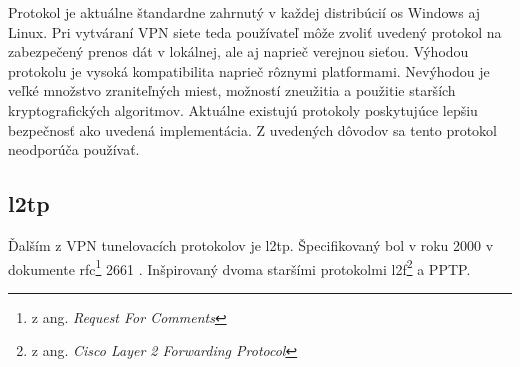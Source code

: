 Protokol je aktuálne štandardne zahrnutý v každej distribúcií \acrshort{os} Windows aj Linux. Pri vytváraní VPN siete teda používateľ môže zvoliť uvedený protokol na zabezpečený prenos dát v lokálnej, ale aj naprieč verejnou sieťou. Výhodou protokolu je vysoká kompatibilita naprieč rôznymi platformami. Nevýhodou je veľké množstvo zraniteľných miest, možností zneužitia a použitie starších kryptografických algoritmov. Aktuálne existujú protokoly poskytujúce lepšiu bezpečnosť ako uvedená implementácia. Z uvedených dôvodov sa tento protokol neodporúča používať.


\subsection{\acrfull{l2tp}}
Ďalším z VPN tunelovacích protokolov je \acrshort{l2tp}. Špecifikovaný bol v roku 2000 v dokumente \acrshort{rfc}\footnote{z ang. \textit{Request For Comments}} 2661 \cite{rfc2661}. Inšpirovaný dvoma staršími protokolmi \acrshort{l2f}\footnote{z ang. \textit{Cisco Layer 2 Forwarding Protocol}} \cite{rfc2341} a PPTP.   

